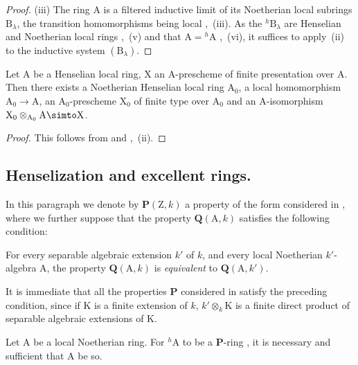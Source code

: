 \begin{proof}
(iii) The ring A is a filtered inductive limit of its Noetherian local subrings $\mathrm{B}_\lambda$, the transition homomorphisms being local ,~(iii).
As the ${}^h\!\mathrm{B}_\lambda$ are Henselian and Noetherian local rings ,~(v) and that $\mathrm{A}={}^h\!\mathrm{A}$ ,~(vi), it suffices to apply~(ii) to the inductive system $(\mathrm{B}_\lambda)$.
\end{proof}

\begin{corollary}[18.6.15]
\label{IV.18.6.15}
Let $\mathrm{A}$ be a Henselian local ring, $\mathrm{X}$ an A-prescheme of finite presentation over $\mathrm{A}$.
Then there exists a Noetherian Henselian local ring $\mathrm{A}_0$, a local homomorphism $\mathrm{A}_0\to\mathrm{A}$, an $\mathrm{A}_0$-prescheme $\mathrm{X}_0$ of finite type over $\mathrm{A}_0$ and an A-isomorphism $\mathrm{X}_0\otimes_{\mathrm{A}_0}\mathrm{A}\simto\mathrm{X}$.
\end{corollary}

\begin{proof}
This follows from  and ,~(ii).
\end{proof}


\subsection{Henselization and excellent rings.}
\label{subsection:IV.18.7}

\begin{env}[18.7.1]
\label{IV.18.7.1}
In this paragraph we denote by $\boldsymbol{P}(\mathrm{Z},k)$ a property of the form considered in , where we further suppose that the property $\boldsymbol{Q}(\mathrm{A},k)$ satisfies the following condition:

For every separable algebraic extension $k'$ of $k$, and every local Noetherian $k'$-algebra A, the property $\boldsymbol{Q}(\mathrm{A},k)$ is \emph{equivalent} to $\boldsymbol{Q}(\mathrm{A},k')$.

It is immediate that all the properties $\boldsymbol{P}$ considered in  satisfy the preceding condition, since if K is a finite extension of $k$, $k'\otimes_k\mathrm{K}$ is a finite direct product of separable algebraic extensions of K.
\end{env}


\begin{proposition}[18.7.2]
\label{IV.18.7.2}
Let $\mathrm{A}$ be a local Noetherian ring.
For ${}^h\!\mathrm{A}$ to be a $\boldsymbol{P}$-ring , it is necessary and sufficient that A be so.
\end{proposition}


